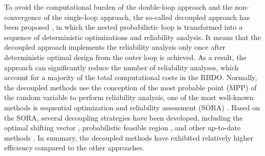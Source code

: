 \documentclass[preprint,3p]{elsarticle}
\begin{document}
\begin{linenumbers}
To avoid the computational burden of the double-loop approach and the non-convergence of the single-loop approach, the so-called decoupled approach has been proposed \cite{Du2004, Aoues2010}, in which the nested probabilistic loop is transformed into a sequence of deterministic optimizations and reliability analysis. It means that the decoupled approach implements the reliability analysis only once after deterministic optimal design from the outer loop is achieved. As a result, the approach can significantly reduce the number of reliability analyses, which account for a majority of the total computational costs in the RBDO. Normally, the decoupled methods use the conception of the most probable point (MPP) of the random variable to perform reliability analysis, one of the most well-known methods is sequential optimization and reliability assessment (SORA) \cite{Du2004, Li2020, jiang2020}. Based on the SORA, several decoupling strategies have been developed, including the optimal shifting vector \cite{Goswami2019, ZHANG2021a, SafaeianHamzehkolaei2016, zheng2023}, probabilistic feasible region \cite{chen2018}, and other up-to-date methods \cite{Li2016, zhang2021b, hamza2022}. In summary, the decoupled methods have exhibited relatively higher efficiency compared to the other approaches.


\end{linenumbers}
\end{document}
